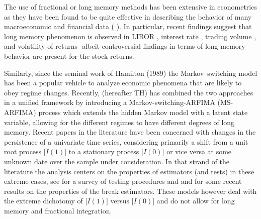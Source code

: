 \documentclass[11pt,fleqn]{article}
\begin{document}
The use of fractional or long memory methods has been extensive in
econometrics as they have been found to be quite effective in describing the
behavior of many macroeconomic and financial data (\cite{Lobato2000} \cite%
{Ding1993}). In particular, recent findings suggest that long memory
phenomenon is observed in LIBOR \citep{Cajueiro2005a,Cajueiro2007}, interest
rate \citep{Cajueiro2007a}, trading volume \citep{Lobato2000,Lux2007}, and
volatility of returns \citep{Lobato2000,Cajueiro2005, Granger1994} -albeit
controversial findings in terms of long memory behavior are present for the
stock returns\citep{Cajueiro2005b,Limam2003,Willinger1999}.

Similarly, since the seminal work of Hamilton (1989) 
the Markov--switching model has been a popular vehicle to analyze economic
phenomena that are likely to obey regime changes. Recently, \cite{Tsay2009}
(hereafter TH) has combined the two approaches in a unified framework by
introducing a Markov-switching-ARFIMA (MS-ARFIMA) process which extends the
hidden Markov model with a latent state variable, allowing for the different
regimes to have different degrees of long memory. Recent papers in the
literature have been concerned with changes in the persistence of a
univariate time series, considering primarily a shift from a unit root
process [$I(1) $] to a stationary process [$I(0) $] or vice versa at some
unknown date over the sample under consideration. In that strand of the
literature the analysis centers on the properties of estimators (and tests)
in these extreme cases, see \cite{Perron2006} for a survey of testing
procedures and \cite{Chong2001} and \cite{Kejriwal2010} for some recent
results on the properties of the break estimators. These models however deal
with the extreme dichotomy of [$I(1)] $ versus [$I(0) $] and do not allow
for long memory and fractional integration.
\end{document}
